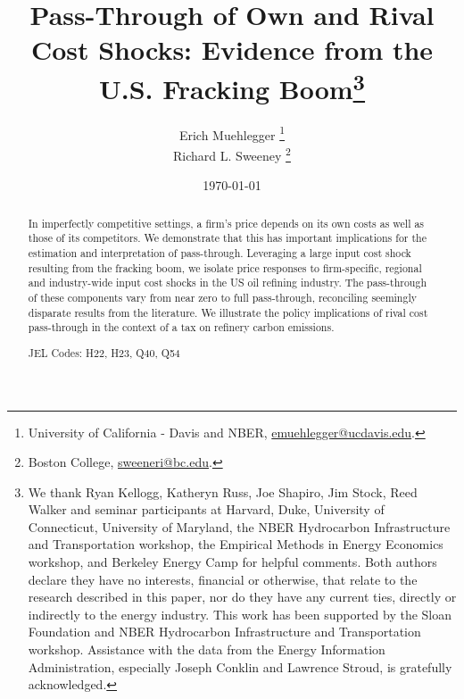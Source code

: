 \documentclass[12pt]{article}
\begin{document}
\doublespace

\title{Pass-Through of Own and Rival Cost Shocks: Evidence from the U.S. Fracking Boom\thanks{We thank Ryan Kellogg, Katheryn Russ, Joe Shapiro, Jim Stock, Reed Walker and seminar participants at Harvard, Duke, University of Connecticut, University of Maryland, the NBER Hydrocarbon Infrastructure and Transportation workshop, the Empirical Methods in Energy Economics workshop, and Berkeley Energy Camp for helpful comments. Both authors declare they have no interests, financial or otherwise, that relate to the research described in this paper, nor do they have any current ties, directly or indirectly to the energy industry. This work has been supported by the Sloan Foundation and NBER Hydrocarbon Infrastructure and Transportation workshop. Assistance with the data from the Energy Information Administration, especially Joseph Conklin and Lawrence Stroud, is gratefully acknowledged. }}

\author{Erich Muehlegger \thanks{University of California - Davis and NBER, \protect\href{mailto:emuehlegger@ucdavis.edu}{emuehlegger@ucdavis.edu}.} \\
 Richard L. Sweeney \thanks{Boston College, \protect\href{mailto:sweeneri@bc.edu}{sweeneri@bc.edu}.}}

\date{\today \\
 \textbf{}}
\maketitle

\begin{abstract}
\normalsize
In imperfectly competitive settings, a firm's price depends on its own costs as well as those of its competitors. We demonstrate that this has important implications for the estimation and interpretation of pass-through. Leveraging a large input cost shock resulting from the fracking boom, we isolate price responses to firm-specific, regional and industry-wide input cost shocks in the US oil refining industry. The pass-through of these components vary from near zero to full pass-through, reconciling seemingly disparate results from the literature. We illustrate the policy implications of rival cost pass-through in the context of a tax on refinery carbon emissions.

\bigskip{}

JEL Codes: H22, H23, Q40, Q54

\bigskip{}
\end{abstract}
\setcounter{page}{1}
\end{document}
